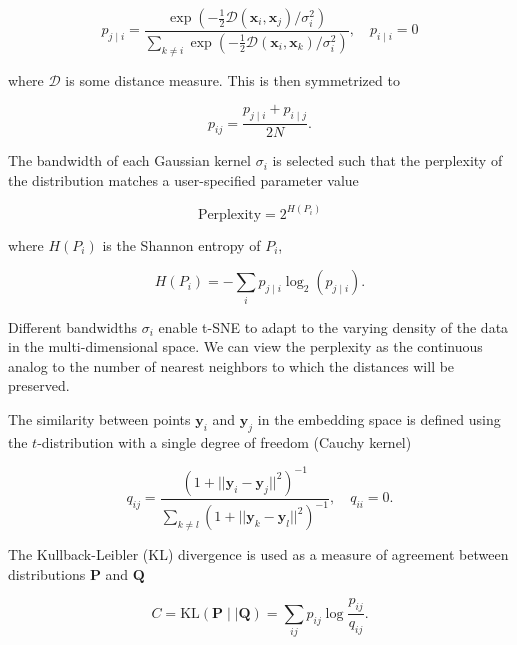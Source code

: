 \documentclass[twocolumn]{bmcart}
\begin{document}
\begin{equation}
p_{j \mid i} = \frac{\exp \left ( -\frac{1}{2} \mathcal{D}(\mathbf{x}_i, \mathbf{x}_j ) / \sigma_i^2 \right )}
{\sum_{k \neq i } \exp \left ( -\frac{1}{2} \mathcal{D}(\mathbf{x}_i, \mathbf{x}_k ) / \sigma_i^2 \right )}, \quad p_{i \mid i} = 0
\label{eq:gaussian_kernel}
\end{equation}

\noindent where $\mathcal{D}$ is some distance measure. This is then
symmetrized to

\begin{equation}
p_{ij} = \frac{p_{j \mid i} + p_{i \mid j}}{2N}.
\label{eq:symmetrize}
\end{equation}

The bandwidth of each Gaussian kernel $\sigma_i$ is selected such that the perplexity of the distribution matches a user-specified parameter value

\begin{equation}
\text{Perplexity} = 2^{H(P_i)}
\end{equation}

\noindent where $H(P_i)$ is the Shannon entropy of $P_i$,

\begin{equation}
H(P_i) = -\sum_i p_{j \mid i} \log_2 (p_{j \mid i}).
\end{equation}

\noindent Different bandwidths $\sigma_i$ enable t-SNE to adapt to the varying density of the data in the multi-dimensional space. We can view the perplexity as the continuous analog to the number of nearest neighbors to which the distances will be preserved. 

The similarity between points $\mathbf{y}_i$ and $\mathbf{y}_j$ in the embedding space is defined using the $t$-distribution with a single degree of freedom (Cauchy kernel)

\begin{equation}
q_{ij} = \frac{\left ( 1 + || \mathbf{y}_i - \mathbf{y}_j ||^2 \right )^{-1}}
{\sum_{k \neq l}\left ( 1 + || \mathbf{y}_k - \mathbf{y}_l ||^2 \right )^{-1}},
\quad q_{ii} = 0.
\label{eq:cauchy_kernel}
\end{equation}

The Kullback-Leibler (KL) divergence is used as a measure of agreement
between distributions $\mathbf{P}$ and $\mathbf{Q}$

\begin{equation}
C = \text{KL}(\mathbf{P} \mid \mid \mathbf{Q}) = \sum_{ij} p_{ij} \log \frac{p_{ij}}{q_{ij}}.
\label{eq:kl_divergence}
\end{equation}
\end{document}
